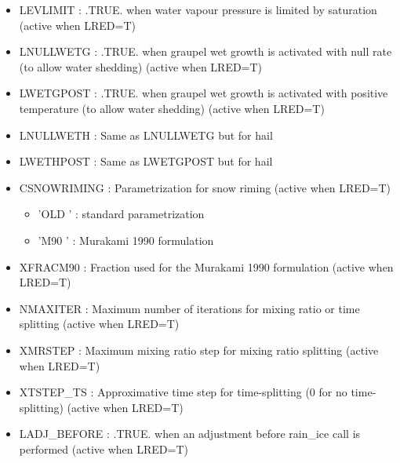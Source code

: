 \begin{itemize}
\item 
LEVLIMIT  : .TRUE. when water vapour pressure is limited by saturation (active when LRED=T)

\item 
LNULLWETG  : .TRUE. when graupel wet growth is activated with null rate (to allow water shedding) (active when LRED=T)

\item 
LWETGPOST  : .TRUE. when graupel wet growth is activated with positive temperature (to allow water shedding) (active when LRED=T)
 
\item 
LNULLWETH  : Same as LNULLWETG but for hail

\item 
LWETHPOST  : Same as LWETGPOST but for hail

\item 
CSNOWRIMING  :  Parametrization for snow riming (active when LRED=T)
\begin{itemize}
\item{'OLD '} : standard parametrization
\item{'M90 '} : Murakami 1990 formulation
\end{itemize}

\item 
XFRACM90 : Fraction used for the Murakami 1990 formulation (active when LRED=T)

\item 
NMAXITER  : Maximum number of iterations for mixing ratio or time splitting (active when LRED=T)

\item 
XMRSTEP  : Maximum mixing ratio step for mixing ratio splitting (active when LRED=T)

\item 
XTSTEP\_TS  : Approximative time step for time-splitting (0 for no time-splitting) (active when LRED=T)

\item 
LADJ\_BEFORE  : .TRUE. when an adjustment before rain\_ice call is performed (active when LRED=T)


\end{itemize}
